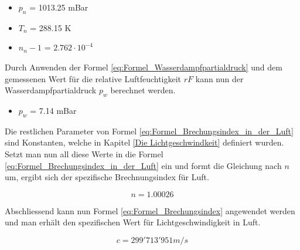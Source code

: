 \begin{itemize}
\item $p_{n}$ = 1013.25 mBar
\item $T_{n}$ = 288.15 K
\item $n_{n}-1$ = $2.762\cdot10^{-4}$
\end{itemize}

Durch Anwenden der Formel \ref{eq:Formel_Wasserdampfpartialdruck} und dem gemessenen Wert für die relative Luftfeuchtigkeit $rF$ kann nun der Wasserdampfpartialdruck $p_{w}$ berechnet werden.

\begin{itemize}
\item $p_{w}$ = 7.14 mBar
\end{itemize}

Die restlichen Parameter von Formel \ref{eq:Formel_Brechungsindex_in_der_Luft} sind Konstanten, welche in Kapitel \ref{Die Lichtgeschwindkeit}  definiert wurden. Setzt man nun all diese Werte in die Formel \ref{eq:Formel_Brechungsindex_in_der_Luft} ein und formt die Gleichung nach $n$ um, ergibt sich der spezifische Brechnungsindex für Luft.

\begin{equation*}
n = 1.00026
\label{eq:Brechungsindex Wert in Luft}
\end{equation*}

Abschliessend kann nun Formel \ref{eq:Formel_Brechungsindex} angewendet werden und man erhält den spezifischen Wert für Lichtgeschwindigkeit in Luft.

\begin{equation*}
c = 299'713'951 m/s
\label{eq:Lichtgeschwindigkeit Wert in Luft}
\end{equation*}
